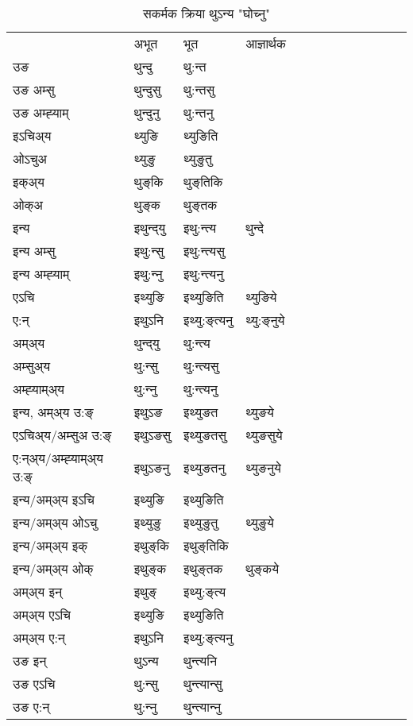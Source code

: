 \begin{table}[H]
\centering
\caption{\label{uŋt.vt} सकर्मक क्रिया  थुऽन्य  "घोच्नु"  }
\begin{tabular}{l|l|l|l|l|l|l|l|l|l|l|l|l}  \toprule
&अभूत & भूत & आज्ञार्थक \\ 
उङ &थुन्दु &थु:न्त \\ 
उङ अम्सु&थुन्दुसु &थु:न्तसु \\ 
उङ अम्ह्‍याम्&थुन्दुनु &थु:न्तनु \\ 
इऽचिअ्य &थ्युङि &थ्युङिति   \\ 
ओऽचुअ        &थ्युङु &थ्युङुतु   \\ 
इक्अ्य&थुङ्‌कि &थुङ्‌तिकि   \\ 
ओक्अ &थुङ्‌क &थुङ्‌तक   \\ 
इन्य & इथुन्द्‌यु  & इथु:न्त्य &थुन्दे  \\ 
इन्य अम्सु& इथु:न्सु  & इथु:न्त्यसु   \\ 
इन्य अम्ह्‍याम्& इथु:न्‍नु  & इथु:न्त्यनु   \\ 
एऽचि & इथ्युङि & इथ्युङिति &थ्युङिये    \\ 
ए:न् & इथुऽनि  & इथ्यु:ङ्‌त्यनु &थ्यु:ङ्‌नुये  \\ 
अम्अ्य & थुन्द्‌यु  & थु:न्त्य  \\ 
अम्सुअ्य & थु:न्सु & थु:न्त्यसु  \\ 
अम्ह्‍याम्अ्य & थु:न्‍नु  & थु:न्त्यनु \\ 
\midrule
इन्य, अम्अ्य उ:ङ्‌ &इथुऽङ &इथ्युङत &थ्युङये \\ 
एऽचिअ्य/अम्सुअ उ:ङ्‌ &इथुऽङसु &इथ्युङतसु &थ्युङसुये \\ 
ए:न्अ्य/अम्ह्‍याम्अ्य उ:ङ्‌ &इथुऽङनु &इथ्युङतनु &थ्युङनुये \\ 
इन्य/अम्अ्य इऽचि &इथ्युङि &इथ्युङिति    \\ 
इन्य/अम्अ्य ओऽचु &इथ्युङु &इथ्युङुतु  &थ्युङुये  \\ 
इन्य/अम्अ्य इक् &इथुङ्‌कि &इथुङ्‌तिकि   \\ 
इन्य/अम्अ्य ओक् &इथुङ्‌क &इथुङ्‌तक  &थुङ्‌कये  \\ 
अम्अ्य इन् & इथुङ्‌ & इथ्यु:ङ्‌त्य   \\ 
अम्अ्य एऽचि & इथ्युङि & इथ्युङिति    \\ 
अम्अ्य ए:न् & इथुऽनि  & इथ्यु:ङ्‌त्यनु  \\ 
\midrule
उङ इन् & थुऽन्य  & थुन्त्यनि  \\ 
उङ एऽचि & थु:न्सु  & थुन्त्यान्सु   \\ 
उङ ए:न्& थु:न्‍नु  & थुन्त्यान्‍नु   \\ 
\bottomrule
\end{tabular}
\end{table}


